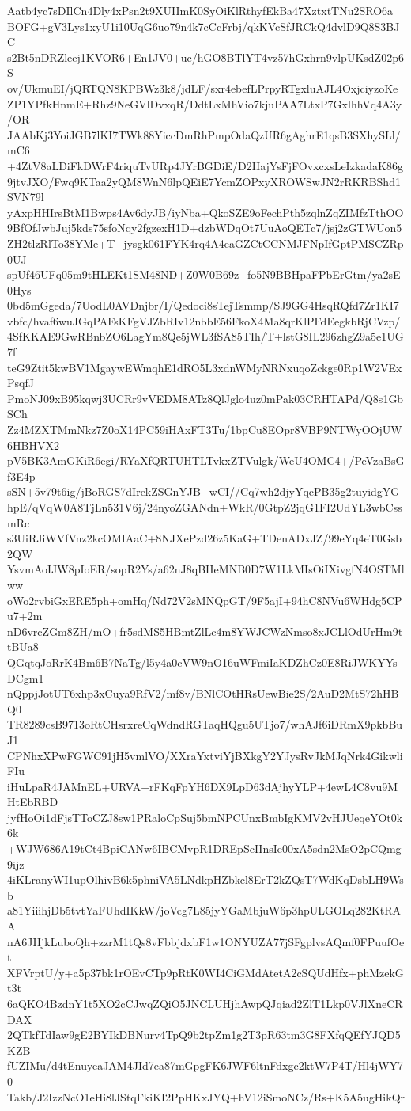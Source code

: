 Aatb4yc7sDIlCn4Dly4xPsn2t9XUIImK0SyOiKlRthyfEkBa47XztxtTNu2SRO6a
BOFG+gV3Lys1xyU1i10UqG6uo79n4k7cCcFrbj/qkKVcSfJRCkQ4dvlD9Q8S3BJC
s2Bt5nDRZleej1KVOR6+En1JV0+uc/hGO8BTlYT4vz57hGxhrn9vlpUKsdZ02p6S
ov/UkmuEI/jQRTQN8KPBWz3k8/jdLF/sxr4ebefLPrpyRTgxluAJL4OxjciyzoKe
ZP1YPfkHnmE+Rhz9NeGVlDvxqR/DdtLxMhVio7kjuPAA7LtxP7GxlhhVq4A3y/OR
JAAbKj3YoiJGB7lKI7TWk88YiccDmRhPmpOdaQzUR6gAghrE1qsB3SXhySLl/mC6
+4ZtV8aLDiFkDWrF4riquTvURp4JYrBGDiE/D2HajYsFjFOvxcxsLeIzkadaK86g
9jtvJXO/Fwq9KTaa2yQM8WnN6lpQEiE7YcmZOPxyXROWSwJN2rRKRBShd1SVN79l
yAxpHHIrsBtM1Bwps4Av6dyJB/iyNba+QkoSZE9oFechPth5zqlnZqZIMfzTthOO
9BfOfJwbJuj5kds75sfoNqy2fgzexH1D+dzbWDqOt7UuAoQETc7/jsj2zGTWUon5
ZH2tlzRlTo38YMe+T+jysgk061FYK4rq4A4eaGZCtCCNMJFNpIfGptPMSCZRp0UJ
spUf46UFq05m9tHLEKt1SM48ND+Z0W0B69z+fo5N9BBHpaFPbErGtm/ya2sE0Hys
0bd5mGgeda/7UodL0AVDnjbr/I/Qedoci8sTejTsmmp/SJ9GG4HsqRQfd7Zr1KI7
vbfc/hvaf6wuJGqPAFsKFgVJZbRIv12nbbE56FkoX4Ma8qrKlPFdEegkbRjCVzp/
4SfKKAE9GwRBnbZO6LagYm8Qe5jWL3fSA85TIh/T+lstG8IL296zhgZ9a5e1UG7f
teG9Ztit5kwBV1MgaywEWmqhE1dRO5L3xdnWMyNRNxuqoZckge0Rp1W2VExPsqfJ
PmoNJ09xB95kqwj3UCRr9vVEDM8ATz8QlJglo4uz0mPak03CRHTAPd/Q8s1GbSCh
Zz4MZXTMmNkz7Z0oX14PC59iHAxFT3Tu/1bpCu8EOpr8VBP9NTWyOOjUW6HBHVX2
pV5BK3AmGKiR6egi/RYaXfQRTUHTLTvkxZTVulgk/WeU4OMC4+/PeVzaBsGf3E4p
sSN+5v79t6ig/jBoRGS7dIrekZSGnYJB+wCI//Cq7wh2djyYqcPB35g2tuyidgYG
hpE/qVqW0A8TjLn531V6j/24nyoZGANdn+WkR/0GtpZ2jqG1FI2UdYL3wbCssmRc
s3UiRJiWVfVnz2kcOMIAaC+8NJXePzd26z5KaG+TDenADxJZ/99eYq4eT0Gsb2QW
YsvmAoIJW8pIoER/sopR2Ys/a62nJ8qBHeMNB0D7W1LkMIsOiIXivgfN4OSTMlww
oWo2rvbiGxERE5ph+omHq/Nd72V2sMNQpGT/9F5ajI+94hC8NVu6WHdg5CPu7+2m
nD6vrcZGm8ZH/mO+fr5sdMS5HBmtZlLc4m8YWJCWzNmso8xJCLlOdUrHm9ttBUa8
QGqtqJoRrK4Bm6B7NaTg/l5y4a0cVW9nO16uWFmiIaKDZhCz0E8RiJWKYYsDCgm1
nQppjJotUT6xhp3xCuya9RfV2/mf8v/BNlCOtHRsUewBie2S/2AuD2MtS72hHBQ0
TR8289csB9713oRtCHsrxreCqWdndRGTaqHQgu5UTjo7/whAJf6iDRmX9pkbBuJ1
CPNhxXPwFGWC91jH5vmlVO/XXraYxtviYjBXkgY2YJysRvJkMJqNrk4GikwliFIu
iHuLpaR4JAMnEL+URVA+rFKqFpYH6DX9LpD63dAjhyYLP+4ewL4C8vu9MHtEbRBD
jyfHoOi1dFjsTToCZJ8sw1PRaloCpSuj5bmNPCUnxBmbIgKMV2vHJUeqeYOt0k6k
+WJW686A19tCt4BpiCANw6IBCMvpR1DREpScIInsIe00xA5sdn2MsO2pCQmg9ijz
4iKLranyWI1upOlhivB6k5phniVA5LNdkpHZbkcl8ErT2kZQsT7WdKqDsbLH9Wsb
a81YiiihjDb5tvtYaFUhdIKkW/joVcg7L85jyYGaMbjuW6p3hpULGOLq282KtRAA
nA6JHjkLuboQh+zzrM1tQs8vFbbjdxbF1w1ONYUZA77jSFgplvsAQmf0FPuufOet
XFVrptU/y+a5p37bk1rOEvCTp9pRtK0WI4CiGMdAtetA2cSQUdHfx+phMzekGt3t
6aQKO4BzdnY1t5XO2cCJwqZQiO5JNCLUHjhAwpQJqiad2ZlT1Lkp0VJlXneCRDAX
2QTkfTdIaw9gE2BYIkDBNurv4TpQ9b2tpZm1g2T3pR63tm3G8FXfqQEfYJQD5KZB
fUZIMu/d4tEnuyeaJAM4JId7ea87mGpgFK6JWF6ltnFdxgc2ktW7P4T/Hl4jWY70
Takb/J2IzzNcO1eHi8lJStqFkiKI2PpHKxJYQ+hV12iSmoNCz/Rs+K5A5ugHikQr
